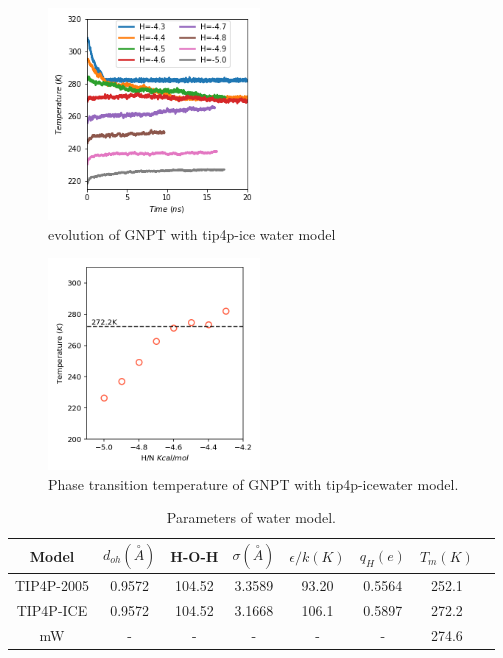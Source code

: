 \documentclass[aps,prl,twocolumn,superscriptaddress]{revtex4-1}
\begin{document}
\begin{figure}[ht]
\centering{}\includegraphics[width=0.5\textwidth]{PoteScan-ice.png} 
\caption{evolution of GNPT with tip4p-ice water model
\label{fig:evolution-ice}} 
\end{figure}
\begin{figure}[ht]
\centering{}\includegraphics[width=0.5\textwidth]{PTtemp-ice.png} 
\caption{Phase transition temperature of GNPT with tip4p-icewater model.
\label{fig:PTtemp-ice}} 
\end{figure}




\begin{table}
\caption{Parameters of water model.}
\centering{}%
\begin{tabular}{cccccccc}
\hline
{Model} & {$d_{oh}(\overset{\circ}{A})$} & { H-O-H}  & {$\sigma (\overset{\circ}{A})$}  & {$\epsilon/k (K)$} & {$q_H(e)$} & {  $T_m (K)$} 
\tabularnewline
\hline

{ TIP4P-2005} & { 0.9572} & {104.52}  & {3.3589}  & {93.20} & {0.5564} & {252.1} \tabularnewline
{ TIP4P-ICE} & { 0.9572} & {104.52}  & {3.1668}  & {106.1} & {0.5897} & {272.2} \tabularnewline
	{ mW} & { -} & {-}  & {-}  & {-} & {-} & {274.6}  \tabularnewline
\hline
\end{tabular}
\label{table:water model}
\end{table}



\end{document}
